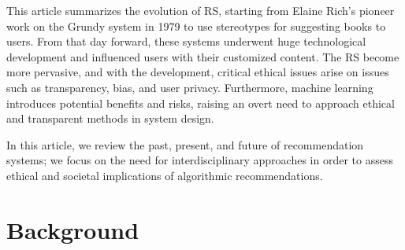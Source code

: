 \documentclass{article}
\begin{document}
This article summarizes the evolution of RS, starting from Elaine Rich's pioneer work on the Grundy system in 1979 \cite{F_RS} to use stereotypes for suggesting books to users. From that day forward, these systems underwent huge technological development and influenced users with their customized content. The RS become more pervasive, and with the development, critical ethical issues arise on issues such as transparency, bias, and user privacy. Furthermore, machine learning introduces potential benefits and risks, raising an overt need to approach ethical and transparent methods in system design.

In this article, we review the past, present, and future of recommendation systems; we focus on the need for interdisciplinary approaches in order to assess ethical and societal implications of algorithmic recommendations.


\section{Background}
\end{document}
